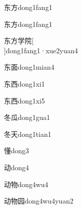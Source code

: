 \begin{verbete}[5;4]{东方}{dong1fang1}
\end{verbete}
\begin{verbete*}[5;4]{东方}{dong1fang1}
\end{verbete*}

\begin{verbete*}[5;4;8;9]{东方学院}[\\]{dong1fang1·xue2yuan4}
\end{verbete*}

\begin{verbete}[5;9]{东面}{dong1mian4}
\end{verbete}

\begin{verbete}[5;6]{东西}{dong1xi1}
\end{verbete}

\begin{verbete}[5;6]{东西}{dong1xi5}
\end{verbete}

\begin{verbete}[5;5]{冬瓜}{dong1gua1}
\end{verbete}

\begin{verbete}[5;4]{冬天}{dong1tian1}
\end{verbete}

\begin{verbete}[15]{懂}{dong3}
\end{verbete}

\begin{verbete}[6]{动}{dong4}
\end{verbete}

\begin{verbete}[6;8]{动物}{dong4wu4}
\end{verbete}

\begin{verbete}[6;8;7]{动物园}{dong4wu4yuan2}
\end{verbete}

